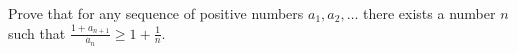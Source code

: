 \problem
Prove that for any sequence of positive numbers $a_1, a_2, \ldots$ there exists
a number $n$ such that $\frac{1 + a_{n+1}}{a_n} \geq 1 + \frac{1}{n}$.
\solution
\endproblem
